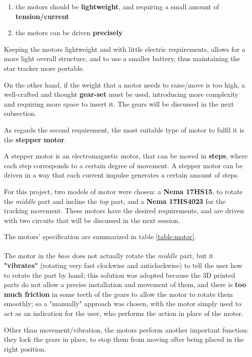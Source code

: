 \documentclass[]{article}
\begin{document}
\begin{enumerate}
	\item the motors should be \textbf{lightweight}, and requiring a small amount of \textbf{tension/current}
	\item the motors can be driven \textbf{precisely}
\end{enumerate}

Keeping the motors lightweight and with little electric requirements, allows for a more light overall structure, and to use a smaller battery, thus maintaining the star tracker more portable. 

On the other hand, if the weight that a motor needs to raise/move is too high, a well-crafted and thought \textbf{gear-set} must be used, introducing more complexity and requiring more space to insert it. The gears will be discussed in the next subsection.

As regards the second requirement, the most suitable type of motor to fulfil it is the \textbf{stepper motor}.

A stepper motor is an electromagnetic motor, that can be moved in \textbf{steps}, where each step corresponds to a certain degree of movement. A stepper motor can be driven in a way that each current impulse generates a certain amount of steps. 

For this project, two models of motor were chosen: a \textbf{Nema 17HS15}, to rotate the \textit{middle} part and incline the \textit{top} part, and a \textbf{Nema 17HS4023} for the tracking movement. These motors have the desired requirements, and are driven with two circuits that will be discussed in the next session. 

The motors' specification are summarized in table \ref{table:motor}.
\\
\\
The motor in the \textit{base} does not actually rotate the \textit{middle} part, but it \textbf{"vibrates"} (rotating very fast clockwise and anticlockwise) to tell the user how to rotate the part by hand; this solution was adopted because the 3D printed parts do not allow a precise installation and movement of them, and there is \textbf{too much friction} in some teeth of the gears to allow the motor to rotate them smoothly; so a "manually" approach was chosen, with the motor simply used to act as an indication for the user, who performs the action in place of the motor. 

Other than movement/vibration, the motors perform another important function: they lock the gears in place, to stop them from moving after being placed in the right position.
\end{document}
